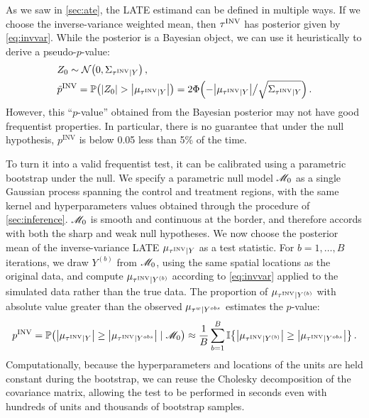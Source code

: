 \documentclass[12pt]{article}
\begin{document}
As we saw in \autoref{sec:ate}, the LATE estimand can be defined in multiple ways.
If we choose the inverse-variance weighted mean, then \(\tau^{\mathrm{INV}}\) has posterior given by \autoref{eq:invvar}.
While the posterior is a Bayesian object, we can use it heuristically to derive a pseudo-\(p\)-value:
\begin{equation}
    \begin{split}
        & Z_0 \sim \normal\del{0, \Sigma_{\invvar \mid Y}} \,, \\
        & \tilde{p}^{\mathrm{INV}} = \Pr\del{ 
            \abs{Z_0} > 
            \abs{
                \mu_{
                    \invvar \mid Y
                }
            } 
        }
        = 2\Phi\del{-
            \abs{
                \mu_{
                    \invvar \mid Y
                }
            }
            \big/
            \sqrt{
                \Sigma_{\invvar \mid Y}
            }
    } \,.
\end{split}
\end{equation}
However, this ``\(p\)-value'' obtained from the Bayesian posterior may not have good frequentist properties.
In particular, there is no guarantee that under the null hypothesis, \(p^{\mathrm{INV}}\) is below 0.05 less than 5\% of the time.

To turn it into a valid frequentist test, it can be calibrated using a parametric bootstrap under the null.
We specify a parametric null model \(\mathscr{M}_0\)
as a single Gaussian process spanning the control and treatment regions,
with the same kernel and hyperparameters values obtained through the procedure of \autoref{sec:inference}.
\(\mathscr{M}_0\) is smooth and continuous at the border,
and therefore accords with both the sharp and weak null hypotheses.
We now choose the posterior mean of the inverse-variance LATE \(\mu_{\tau^{\mathrm{INV}} \mid Y}\) as a test statistic.
For \(b=1,\dotsc,B\) iterations, we draw \(Y^{(b)}\) from \(\mathscr{M}_0\),
using the same spatial locations as the original data,
and compute \(\mu_{\tau^{\mathrm{INV}} \mid Y^{(b)}}\) according to \autoref{eq:invvar} applied to the simulated data rather than the true data.
The proportion of \(\mu_{\tau^{\mathrm{INV}} \mid Y^{(b)}}\) with absolute value greater than the observed \(\mu_{\tau^{w} \mid Y^{obs}}\) estimates the \(p\)-value:
\begin{equation}
    p^{\mathrm{INV}} = \Pr\del{ \abs{\mu_{\invvar \mid Y}} \ge \abs{\mu_{\invvar \mid Y^{obs}}} \mid \modnull} 
    \approx \frac{1}{B} 
    \sum_{b=1}^B 
        \Ind\cbr{
            \abs{
                \mu_{\invvar \mid Y^{(b)}}
            } 
            \ge  
            \abs{
                \mu_{\invvar \mid Y^{obs}}
            } 
        }
    \,.
\end{equation}
Computationally, because the hyperparameters and locations of the units are held constant during the bootstrap, we can reuse the Cholesky decomposition of the covariance matrix, allowing the test to be performed in seconds even with hundreds of units and thousands of bootstrap samples.
\end{document}
